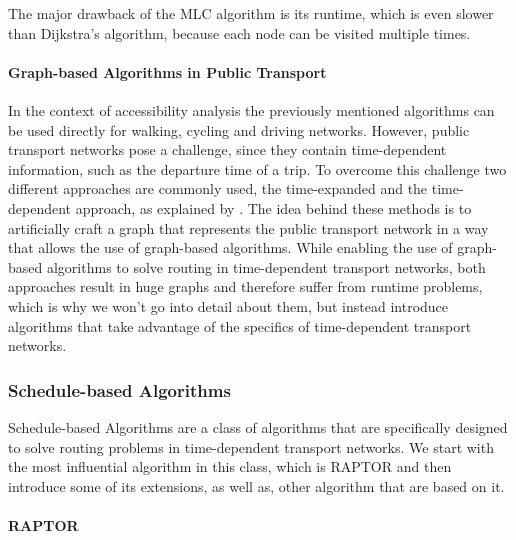 The major drawback of the MLC algorithm is its runtime, which is even slower than Dijkstra's algorithm, because each node can be visited multiple times.


\paragraph{Graph-based Algorithms in Public Transport}
\label{subsubsec:graph_based_algorithms_in_public_transport}


In the context of accessibility analysis the previously mentioned algorithms can be used directly for walking, cycling and driving networks.
However, public transport networks pose a challenge, since they contain time-dependent information, such as the departure time of a trip.
To overcome this challenge two different approaches are commonly used, the time-expanded and the time-dependent approach, as explained by .
The idea behind these methods is to artificially craft a graph that represents the public transport network in a way that allows the use of graph-based algorithms.
While enabling the use of graph-based algorithms to solve routing in time-dependent transport networks, both approaches result in huge graphs and therefore suffer from runtime problems, which is why we won't go into detail about them, but instead introduce algorithms that take advantage of the specifics of time-dependent transport networks.

\subsubsection{Schedule-based Algorithms}

Schedule-based Algorithms are a class of algorithms that are specifically designed to solve routing problems in time-dependent transport networks.
We start with the most influential algorithm in this class, which is RAPTOR  and then introduce some of its extensions, as well as, other algorithm that are based on it.

\paragraph{RAPTOR}
\label{subsubsec:raptor}

